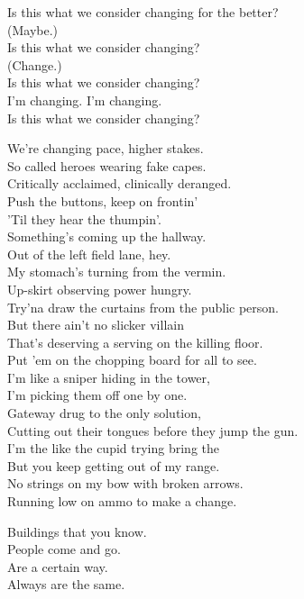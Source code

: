 Is this what we consider changing for the better? \\
(Maybe.) \\
Is this what we consider changing? \\
(Change.) \\
Is this what we consider changing? \\
I'm changing. I'm changing. \\
Is this what we consider changing? \\


We're changing pace, higher stakes. \\
So called heroes wearing fake capes. \\
Critically acclaimed, clinically deranged. \\
Push the buttons, keep on frontin' \\
'Til they hear the thumpin'. \\
Something's coming up the hallway. \\
Out of the left field lane, hey. \\

My stomach's turning from the vermin. \\
Up-skirt observing power hungry. \\
Try'na draw the curtains from the public person. \\
But there ain't no slicker villain \\
That's deserving a serving on the killing floor. \\
Put 'em on the chopping board for all to see. \\

I'm like a sniper hiding in the tower, \\
I'm picking them off one by one. \\
Gateway drug to the only solution, \\
Cutting out their tongues before they jump the gun. \\

I'm the like the cupid trying bring the  \\
But you keep getting out of my range. \\
No strings on my bow with broken arrows. \\
Running low on ammo to make a change. \\


Buildings that you know. \\
People come and go. \\
Are a certain way. \\
Always are the same. \\

